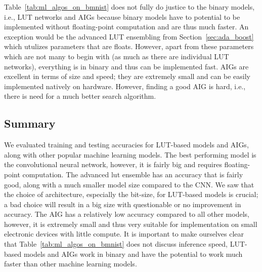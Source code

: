 \noindent Table~\ref{tab:ml_algos_on_bmnist} does not fully do justice to the binary models, i.e., LUT networks and AIGs because binary models have to potential to be implemented without floating-point computation and are thus much faster. An exception would be the advanced LUT ensembling from Section~\ref{sec:ada_boost} which utulizes parameters that are floats. However, apart from these parameters which are not many to begin with (as much as there are individual LUT networks), everything is in binary and thus can be implemented fast. AIGs are excellent in terms of size and speed; they are extremely small and can be easily implemented natively on hardware. However, finding a good AIG is hard, i.e., there is need for a much better search algorithm.

\subsection{Summary}
We evaluated training and testing accuracies for LUT-based models and AIGs, along with other popular machine learning models. The best performing model is the convolutional neural network, however, it is fairly big and requires floating-point computation. The advanced lut ensemble has an accuracy that is fairly good, along with a much smaller model size compared to the CNN. We saw that the choice of architecture, especially the bit-size, for LUT-based models is crucial; a bad choice will result in a big size with questionable or no improvement in accuracy. The AIG has a relatively low accuracy compared to all other models, however, it is extremely small and thus very suitable for implementation on small electronic devices with little compute. It is important to make ourselves clear that Table~\ref{tab:ml_algos_on_bmnist} does not discuss inference speed, LUT-based models and AIGs work in binary and have the potential to work much faster than other machine learning models.
